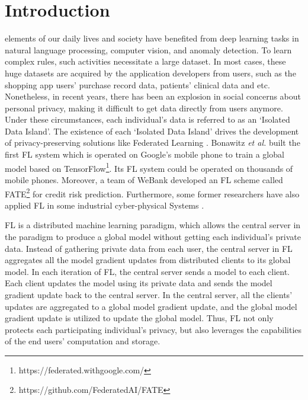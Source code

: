 \documentclass[journal]{IEEEtran}
\begin{document}
\section{Introduction}
 elements of our daily lives and society have benefited from deep learning tasks in natural language processing, computer vision, and anomaly detection. To learn complex rules, such activities necessitate a large dataset. In most cases, these huge datasets are acquired by the application developers from users, such as the shopping app users' purchase record data, patients' clinical data and etc. Nonetheless, in recent years, there has been an explosion in social concerns about personal privacy, making it difficult to get data directly from users anymore. Under these circumstances, each individual's data is referred to as an `Isolated Data Island'. The existence of each `Isolated Data Island' drives the development of privacy-preserving solutions like Federated Learning \cite{ref_01_GoogleFL,ref_02_FLConcept,li2021a}. Bonawitz \textit{et al.} built the first FL system which is operated on Google's mobile phone to train a global model based on TensorFlow\footnote{https://federated.withgoogle.com/}. Its FL system could be operated on thousands of mobile phones. Moreover, a team of WeBank developed an FL scheme called FATE\footnote{https://github.com/FederatedAI/FATE} for credit risk prediction. Furthermore, some former researchers have also applied FL in some industrial cyber-physical Systems \cite{ref_42_FLApp, ref_43_FLApp, hao2020hao}.

\par FL is a distributed machine learning paradigm, which allows the central server in the paradigm to produce a global model without getting each individual's private data. Instead of gathering private data from each user, the central server in FL aggregates all the model gradient updates from distributed clients to its global model. In each iteration of FL, the central server sends a model to each client. Each client updates the model using its private data and sends the model gradient update back to the central server. In the central server, all the clients' updates are aggregated to a global model gradient update, and the global model gradient update is utilized to update the global model. Thus, FL not only protects each participating individual's privacy, but also leverages the capabilities of the end users' computation and storage.
\end{document}
